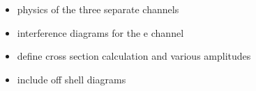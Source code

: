 

\begin{itemize}
\item physics of the three separate channels
\item interference diagrams for the e channel
\item define cross section calculation and various amplitudes
\item include off shell diagrams



\end{itemize}
